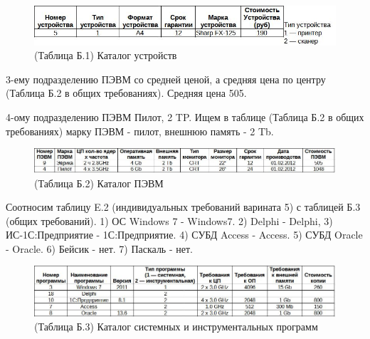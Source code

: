 \documentclass[12pt, a4paper, simple]{eskdtext}
\begin{document}
    \begin{figure}[h!]
        \centering
        \includegraphics[width=16cm]
            {_docs/КаталогУстройств.jpg}
        \caption{(Таблица Б.1) Каталог устройств}
    \end{figure}

    3-ему подразделению ПЭВМ со средней ценой, а средняя цена по центру (Таблица Б.2 в общих требованиях).
    Средняя цена 505.

    4-ому подразделению ПЭВМ Пилот, 2 TP. Ищем в таблице (Таблица Б.2 в общих требованиях) марку ПЭВМ - пилот, внешнюю память - 2 Tb. 

    \begin{figure}[h!]
        \centering
        \includegraphics[width=16cm]
            {_docs/КаталогПЭВМ.jpg}
        \caption{(Таблица Б.2) Каталог ПЭВМ}
    \end{figure}

    Соотносим таблицу E.2 (индивидуальных требований варината 5) с таблицей Б.3 (общих требований).
    1) ОС Windows 7 - Windows7. 2) Delphi - Delphi, 3)  ИС-1С:Предприятие - 1С:Предприятие.
    4) СУБД Access - Access. 5) СУБД Oracle - Oracle. 6) Бейсик - нет. 7) Паскаль - нет. 

    \begin{figure}[h!]
        \centering
        \includegraphics[width=16cm]
            {_docs/КаталогСистемныхИИнструментальныхПрограмм.jpg}
        \caption{(Таблица Б.3) Каталог системных и инструментальных программ}
    \end{figure}

\end{document}
